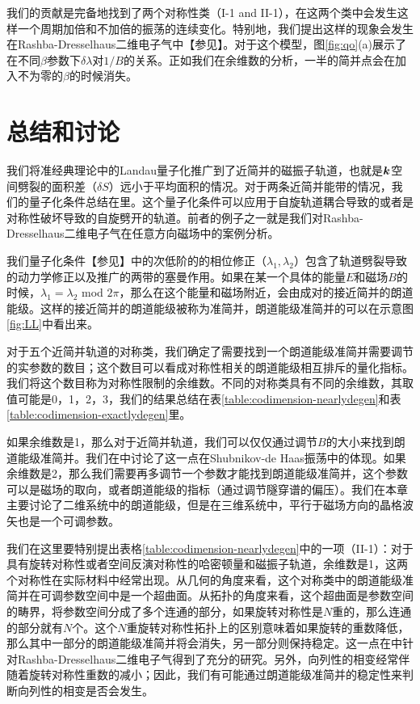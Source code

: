 我们的贡献是完备地找到了两个对称性类（I-1 and II-1），在这两个类中会发生这样一个周期加倍和不加倍的振荡的连续变化。特别地，我们提出这样的现象会发生在Rashba-Dresselhaus二维电子气中【参见】。对于这个模型，图\ref{fig:qo}(a)展示了在不同$\beta$参数下$\delta \lambda$对$1/B$的关系。正如我们在余维数的分析，一半的简并点会在加入不为零的$\beta$的时候消失。

\section{总结和讨论}\label{sec:discussion}

我们将准经典理论中的Landau量子化推广到了近简并的磁振子轨道，也就是$\boldsymbol{k}$空间劈裂的面积差（$\delta S$）远小于平均面积的情况。对于两条近简并能带的情况，我们的量子化条件总结在里。这个量子化条件可以应用于自旋轨道耦合导致的或者是对称性破坏导致的自旋劈开的轨道。前者的例子之一就是我们对Rashba-Dresselhaus二维电子气在任意方向磁场中的案例分析。

我们量子化条件【参见】中的次低阶的的相位修正（$\lambda_1,\lambda_2$）包含了轨道劈裂导致的动力学修正以及推广的两带的塞曼作用。如果在某一个具体的能量$E$和磁场$B$的时候，$\lambda_1{=}\lambda_2$ mod $2\pi$，那么在这个能量和磁场附近，会由成对的接近简并的朗道能级。这样的接近简并的朗道能级被称为准简并，朗道能级准简并的可以在示意图\ref{fig:LL}中看出来。


对于五个近简并轨道的对称类，我们确定了需要找到一个朗道能级准简并需要调节的实参数的数目；这个数目可以看成对称性相关的朗道能级相互排斥的量化指标。我们将这个数目称为对称性限制的余维数。不同的对称类具有不同的余维数，其取值可能是0，1，2，3，我们的结果总结在表\ref{table:codimension-nearlydegen}和表\ref{table:codimension-exactlydegen}里。

如果余维数是1，那么对于近简并轨道，我们可以仅仅通过调节$B$的大小来找到朗道能级准简并。我们在中讨论了这一点在Shubnikov-de Haas振荡中的体现。如果余维数是2，那么我们需要再多调节一个参数才能找到朗道能级准简并，这个参数可以是磁场的取向\cite{yakovenko_angular_2006}，或者朗道能级的指标（通过调节隧穿谱的偏压）\cite{Sangjun_Cd3As2,Ilija_SnTe,kushwaha_Dirac}。我们在本章主要讨论了二维系统中的朗道能级，但是在三维系统中，平行于磁场方向的晶格波矢也是一个可调参数。


我们在这里要特别提出表格\ref{table:codimension-nearlydegen}中的一项（II-1）：对于具有旋转对称性或者空间反演对称性的哈密顿量和磁振子轨道，余维数是1，这两个对称性在实际材料中经常出现。从几何的角度来看，这个对称类中的朗道能级准简并在可调参数空间中是一个超曲面。从拓扑的角度来看，这个超曲面是参数空间的畴界，将参数空间分成了多个连通的部分，如果旋转对称性是$N$重的，那么连通的部分就有$N$个。这个$N$重旋转对称性拓扑上的区别意味着如果旋转的重数降低，那么其中一部分的朗道能级准简并将会消失，另一部分则保持稳定。这一点在中针对Rashba-Dresselhaus二维电子气得到了充分的研究。另外，向列性的相变经常伴随着旋转对称性重数的减小\cite{fradkin_nematic_2010}；因此，我们有可能通过朗道能级准简并的稳定性来判断向列性的相变是否会发生。

